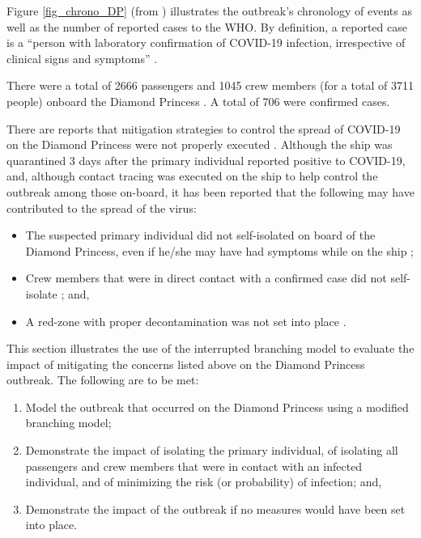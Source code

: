 \documentclass[sr]{drdc-report}
\begin{document}
Figure \ref{fig_chrono_DP}  (from \cite{10..15585/mmwr..mm6912e3}) illustrates the outbreak's chronology of events as well as the number of reported cases to the WHO. By definition, a reported case is a “person with laboratory confirmation of COVID-19 infection, irrespective of clinical signs and symptoms” \cite{WHO_surv}. 

There were a total of 2666 passengers and 1045 crew members (for a total of 3711 people) onboard the Diamond Princess \cite{10..15585/mmwr..mm6912e3}. A total of 706 were confirmed cases.  

There are reports that mitigation strategies to control the spread of COVID-19 on the Diamond Princess were not properly executed \cite{10..1002/jgf2..326}. Although the ship was quarantined 3 days after the primary individual reported positive to COVID-19, and, although contact tracing was executed on the ship to help control the outbreak among those on-board, it has been reported that the following may have contributed to the spread of the virus:

\begin{itemize} 
\item The suspected primary individual did not self-isolated on board of the Diamond Princess, even if he/she may have had symptoms while on the ship \cite{news_patient_zero}\cite{10..1016/j..ijid..2020..02..033};
\item Crew members that were in direct contact with a confirmed case did not self-isolate \cite{10..1002/jgf2..326} \cite{10..15585/mmwr..mm6912e3}; and,
\item A red-zone with proper decontamination was not set into place \cite{10..1002/jgf2..326}. 
\end{itemize}	
 
This section illustrates the use of the interrupted branching model to evaluate the impact of mitigating the concerns listed above on the Diamond Princess outbreak. The following are to be met:

\begin{enumerate}
\item Model the outbreak that occurred on the Diamond Princess using a modified branching model;
\item Demonstrate the impact of isolating the primary individual, of isolating all passengers and crew members that were in contact with an infected individual, and of minimizing the risk (or probability) of infection; and, 
\item Demonstrate the impact of the outbreak if no measures would have been set into place.
\end{enumerate}
\end{document}
